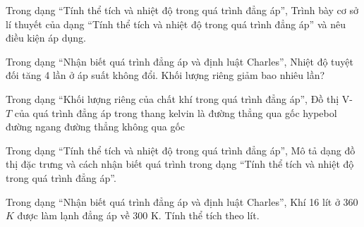\begin{ex}
Trong dạng “Tính thể tích và nhiệt độ trong quá trình đẳng áp”, Trình bày cơ sở lí thuyết của dạng “Tính thể tích và nhiệt độ trong quá trình đẳng áp” và nêu điều kiện áp dụng.
\choiceTF

\end{ex}

\begin{ex}
Trong dạng “Nhận biết quá trình đẳng áp và định luật Charles”, Nhiệt độ tuyệt đối tăng 4 lần ở áp suất không đổi. Khối lượng riêng giảm bao nhiêu lần?
\end{ex}

\begin{ex}
Trong dạng “Khối lượng riêng của chất khí trong quá trình đẳng áp”, Đồ thị V- $T$ của quá trình đẳng áp trong thang kelvin là
\choice
{\True đường thẳng qua gốc}
{hypebol}
{đường ngang}
{đường thẳng không qua gốc}
\end{ex}


\begin{ex}
Trong dạng “Tính thể tích và nhiệt độ trong quá trình đẳng áp”, Mô tả dạng đồ thị đặc trưng và cách nhận biết quá trình trong dạng “Tính thể tích và nhiệt độ trong quá trình đẳng áp”.
\choiceTF

\end{ex}

\begin{ex}
Trong dạng “Nhận biết quá trình đẳng áp và định luật Charles”, Khí 16 lít ở 360 $K$ được làm lạnh đẳng áp về 300 K. Tính thể tích theo lít.
\end{ex}

